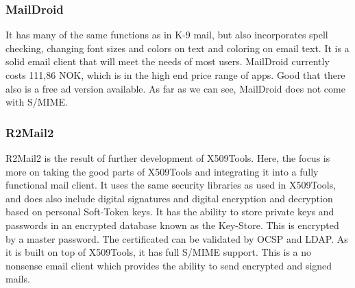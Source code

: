 \subsubsection{MailDroid}
It has many of the same functions as in K-9 mail, but also incorporates spell checking, changing font sizes and colors on text and coloring on email text. It is a solid email client that will meet the needs of most users. MailDroid currently costs 111,86 NOK, which is in the high end price range of apps. Good that there also is a free ad version available. As far as we can see, MailDroid does not come with S/MIME. 

\subsubsection{R2Mail2}
R2Mail2 is the result of further development of X509Tools. Here, the focus is more on taking the good parts of X509Tools and integrating it into a fully functional mail client. It uses the same security libraries as used in X509Tools, and does also include digital signatures and digital encryption and decryption based on personal Soft-Token keys\cite{bib:r2mail2}. It has the ability to store private keys and passwords in an encrypted database known as the Key-Store. This is encrypted by a master password. The certificated can be validated by OCSP and LDAP. As it is built on top of X509Tools, it has full S/MIME support. This is a no nonsense email client which provides the ability to send encrypted and signed mails.

